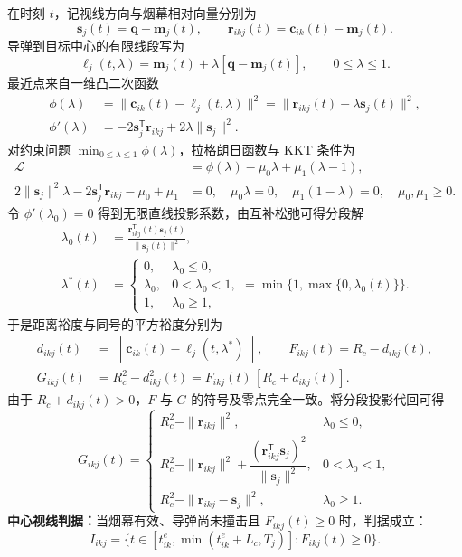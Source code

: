 \documentclass[UTF8,a4paper,12pt,fontset=windows]{ctexart}
\begin{document}
在时刻 $t$，记视线方向与烟幕相对向量分别为
\[
\bm s_j(t)=\bm q-\bm m_j(t),\qquad
\bm r_{ikj}(t)=\bm c_{ik}(t)-\bm m_j(t).
\]
导弹到目标中心的有限线段写为
\begin{equation}
\bm \ell_j(t,\lambda)=\bm m_j(t)+\lambda[\bm q-\bm m_j(t)],\qquad 0\leq\lambda\leq1.
\end{equation}
最近点来自一维凸二次函数
\begin{align}
\phi(\lambda)
&=\|\bm c_{ik}(t)-\bm\ell_j(t,\lambda)\|^2
=\|\bm r_{ikj}(t)-\lambda\bm s_j(t)\|^2,\label{eq:projection-objective}\\
\phi'(\lambda)
&=-2\bm s_j^{\mathsf T}\bm r_{ikj}+2\lambda\|\bm s_j\|^2.
\end{align}
对约束问题 $\min_{0\leq\lambda\leq1}\phi(\lambda)$，拉格朗日函数与 KKT 条件为
\begin{align}
\mathcal L&=\phi(\lambda)-\mu_0\lambda+\mu_1(\lambda-1),\\
2\|\bm s_j\|^2\lambda-2\bm s_j^{\mathsf T}\bm r_{ikj}-\mu_0+\mu_1&=0,
\quad \mu_0\lambda=0,
\quad \mu_1(1-\lambda)=0,
\quad \mu_0,\mu_1\geq0.
\end{align}
令 $\phi'(\lambda_0)=0$ 得到无限直线投影系数，由互补松弛可得分段解
\begin{align}
\lambda_0(t)&=\frac{\bm r_{ikj}^{\mathsf T}(t)\bm s_j(t)}{\|\bm s_j(t)\|^2},\\
\lambda^*(t)&=
\begin{cases}
0,&\lambda_0\leq0,\\
\lambda_0,&0<\lambda_0<1,\\
1,&\lambda_0\geq1,
\end{cases}
=\min\{1,\max\{0,\lambda_0(t)\}\}.
\label{eq:projection}
\end{align}
于是距离裕度与同号的平方裕度分别为
\begin{align}
d_{ikj}(t)&=\left\|\bm c_{ik}(t)-\bm\ell_j(t,\lambda^*)\right\|,
\qquad F_{ikj}(t)=R_c-d_{ikj}(t),\label{eq:margin}\\
G_{ikj}(t)&=R_c^2-d_{ikj}^2(t)
=F_{ikj}(t)\,[R_c+d_{ikj}(t)].\label{eq:squared-margin}
\end{align}
由于 $R_c+d_{ikj}(t)>0$，$F$ 与 $G$ 的符号及零点完全一致。将分段投影代回可得
\begin{equation}
G_{ikj}(t)=
\begin{cases}
R_c^2-\|\bm r_{ikj}\|^2,&\lambda_0\leq0,\\[2pt]
R_c^2-\|\bm r_{ikj}\|^2+\dfrac{(\bm r_{ikj}^{\mathsf T}\bm s_j)^2}{\|\bm s_j\|^2},&0<\lambda_0<1,\\[7pt]
R_c^2-\|\bm r_{ikj}-\bm s_j\|^2,&\lambda_0\geq1.
\end{cases}
\label{eq:squared-margin-piecewise}
\end{equation}
\textbf{中心视线判据：}当烟幕有效、导弹尚未撞击且 $F_{ikj}(t)\geq0$ 时，判据成立：
\begin{equation}
I_{ikj}=\{t\in[t_{ik}^e,\min(t_{ik}^e+L_c,T_j)]:F_{ikj}(t)\geq0\}.
\label{eq:interval}
\end{equation}
\end{document}
